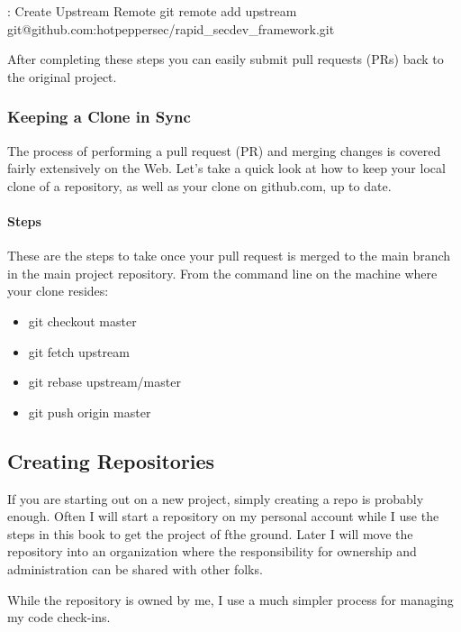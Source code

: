 \begin{mybox}{\thetcbcounter: Create Upstream Remote}
git remote add upstream git@github.com:hotpeppersec/rapid\_secdev\_framework.git
\end{mybox}

After completing these steps you can easily submit pull requests (PRs)
back to the original project.

\hypertarget{keeping-a-clone-in-sync}{%
\subsubsection{Keeping a Clone in Sync}\label{keeping-a-clone-in-sync}}

The process of performing a pull request (PR) and merging changes is
covered fairly extensively on the Web. Let's take a quick look at how to
keep your local clone of a repository, as well as your clone on
github.com, up to date.

\hypertarget{steps-1}{%
\paragraph{Steps}\label{steps-1}}

These are the steps to take once your pull request is merged to the main
branch in the main project repository. From the command line on the
machine where your clone resides:

\begin{itemize}
\item
  git checkout master
\item
  git fetch upstream
\item
  git rebase upstream/master
\item
  git push origin master
\end{itemize}


\subsection{Creating Repositories}

\justify
If you are starting out on a new project, simply creating a repo is
probably enough. Often I will start a repository on my personal account
while I use the steps in this book to get the project of fthe ground.
Later I will move the repository into an organization where the
responsibility for ownership and administration can be shared with other
folks.

\justify
While the repository is owned by me, I use a much simpler process for
managing my code check-ins.

